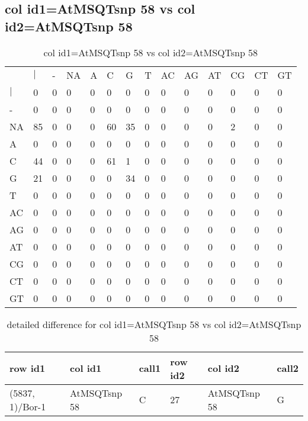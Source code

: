 \subsection{col id1=AtMSQTsnp 58 vs col id2=AtMSQTsnp 58}
\begin{center}
\begin{longtable}{|l|l|l|l|l|l|l|l|l|l|l|l|l|l|}
\caption{col id1=AtMSQTsnp 58 vs col id2=AtMSQTsnp 58} \label{table_dm948}\\
\hline
\\
\hline
&$|$&-&NA&A&C&G&T&AC&AG&AT&CG&CT&GT\\
$|$&0&0&0&0&0&0&0&0&0&0&0&0&0\\
-&0&0&0&0&0&0&0&0&0&0&0&0&0\\
NA&85&0&0&0&60&35&0&0&0&0&2&0&0\\
A&0&0&0&0&0&0&0&0&0&0&0&0&0\\
C&44&0&0&0&61&1&0&0&0&0&0&0&0\\
G&21&0&0&0&0&34&0&0&0&0&0&0&0\\
T&0&0&0&0&0&0&0&0&0&0&0&0&0\\
AC&0&0&0&0&0&0&0&0&0&0&0&0&0\\
AG&0&0&0&0&0&0&0&0&0&0&0&0&0\\
AT&0&0&0&0&0&0&0&0&0&0&0&0&0\\
CG&0&0&0&0&0&0&0&0&0&0&0&0&0\\
CT&0&0&0&0&0&0&0&0&0&0&0&0&0\\
GT&0&0&0&0&0&0&0&0&0&0&0&0&0\\
\hline
\end{longtable}
\end{center}

\begin{center}
\begin{longtable}{|l|l|l|l|l|l|}
\caption{detailed difference for col id1=AtMSQTsnp 58 vs col id2=AtMSQTsnp 58} \label{table_dm949}\\
\hline
row id1&col id1&call1&row id2&col id2&call2\\
\hline
(5837, 1)/Bor-1&AtMSQTsnp 58&C&27&AtMSQTsnp 58&G\\
\hline
\end{longtable}
\end{center}

